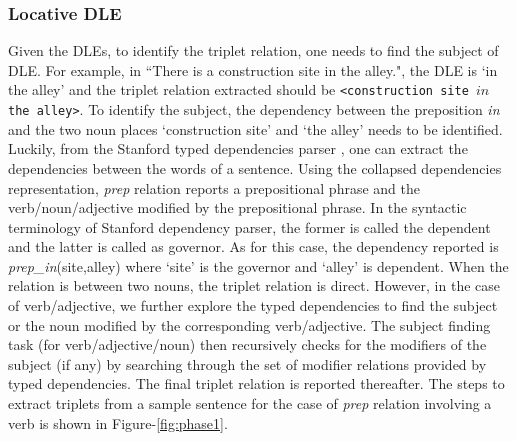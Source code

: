 \documentclass{acm_proc_article-sp}
\begin{document}
\subsubsection*{Locative DLE}
Given the DLEs, to identify the triplet relation, one needs to find the subject of DLE. For example, in ``There is a construction site in the alley.", the DLE is `in the alley' and the triplet relation extracted should be \texttt{<construction site $in$ the alley>}. To  identify the subject, the dependency between the preposition \textit{in} and the two noun places `construction site' and `the alley' needs to be identified. Luckily, from the Stanford typed dependencies parser \cite{marneffe:stanford}, one can extract the dependencies between the words of a sentence. Using the collapsed dependencies representation, \textit{prep} relation reports a prepositional phrase and the verb/noun/adjective modified by the prepositional phrase. In the syntactic terminology of Stanford dependency parser, the former is called the dependent and the latter is called as governor. As for this case, the dependency reported is \textit{prep\_in}(site,alley) where `site' is the governor and `alley' is dependent. When the relation is between two nouns, the triplet relation is direct. 
However, in the case of verb/adjective, we further explore the typed dependencies to find the subject or the noun modified by the corresponding verb/adjective. The subject finding task (for verb/adjective/noun) then recursively checks for the modifiers of the subject (if any) by searching through the set of modifier relations provided by typed dependencies. The final triplet relation is reported thereafter. The steps to extract triplets from a sample sentence for the case of \textit{prep} relation involving a verb is shown in Figure-\ref{fig:phase1}. 
 
\end{document}
